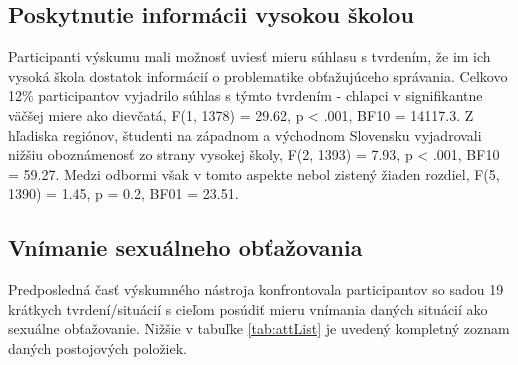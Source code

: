 \documentclass[
]{article}
\begin{document}
\hypertarget{poskytnutie-informuxe1cii-vysokou-ux161kolou}{%
\subsection{Poskytnutie informácii vysokou školou}\label{poskytnutie-informuxe1cii-vysokou-ux161kolou}}

Participanti výskumu mali možnosť uviesť mieru súhlasu s tvrdením, že im ich vysoká škola dostatok informácií o problematike obťažujúceho správania. Celkovo 12\% participantov vyjadrilo súhlas s týmto tvrdením - chlapci v signifikantne väčšej miere ako dievčatá, F(1, 1378) = 29.62, p \textless{} .001, BF10 = 14117.3. Z hľadiska regiónov, študenti na západnom a východnom Slovensku vyjadrovali nižšiu oboznámenosť zo strany vysokej školy, F(2, 1393) = 7.93, p \textless{} .001, BF10 = 59.27. Medzi odbormi však v tomto aspekte nebol zistený žiaden rozdiel, F(5, 1390) = 1.45, p = 0.2, BF01 = 23.51.

\hypertarget{vnuxedmanie-sexuuxe1lneho-obux165aux17eovania}{%
\subsection{Vnímanie sexuálneho obťažovania}\label{vnuxedmanie-sexuuxe1lneho-obux165aux17eovania}}

Predposledná časť výskumného nástroja konfrontovala participantov so sadou 19 krátkych tvrdení/situácií s cieľom posúdiť mieru vnímania daných situácií ako sexuálne obťažovanie. Nižšie v tabuľke \ref{tab:attList} je uvedený kompletný zoznam daných postojových položiek.
\end{document}
